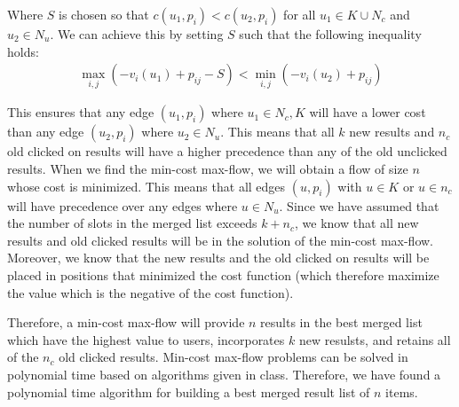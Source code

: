 \documentclass[psamsfonts]{amsart}
\newenvironment{sol}{\vspace{0.25cm}{\large \bfseries Solution:}}{\qedsymbol}
\begin{document}
\begin{sol}
Where $S$ is chosen so that $c(u_1,p_i) < c(u_2, p_i)$ for all $u_1 \in K \cup N_c$ and $u_2 \in N_u$. We can achieve this by setting $S$ such that the following inequality holds:
\begin{eqnarray}
\max_{i,j} \left( -v_i(u_1) + p_{ij} - S \right) < \min_{i,j} \left( {-v_i(u_2) + p_{ij} } \right)
\end{eqnarray}

This ensures that any edge $(u_1, p_i)$ where $u_1 \in N_c, K$ will have a lower cost than any edge $(u_2, p_i)$ where $u_2 \in N_u$. This means that all $k$ new results and $n_c$ old clicked on results will have a higher precedence than any of the old unclicked results. When we find the min-cost max-flow, we will obtain a flow of size $n$ whose cost is minimized. This means that all edges $(u, p_i)$ with $u \in K$ or $u \in n_c$ will have precedence over any edges where $u \in N_u$. Since we have assumed that the number of slots in the merged list exceeds $k + n_c$, we know that all new results and old clicked results will be in the solution of the min-cost max-flow. Moreover, we know that the new results and the old clicked on results will be placed in positions that minimized the cost function (which therefore maximize the value which is the negative of the cost function).

Therefore, a min-cost max-flow will provide $n$ results in the best merged list which have the highest value to users, incorporates $k$ new resulsts, and retains all of the $n_c$ old clicked results. Min-cost max-flow problems can be solved in polynomial time based on algorithms given in class. Therefore, we have found a polynomial time algorithm for building a best merged result list of $n$ items.
\end{sol}
\end{document}
